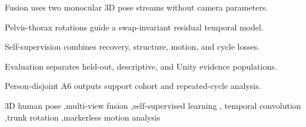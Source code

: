 \documentclass[a4paper,fleqn]{cas-sc}
\begin{document}
\begin{highlights}
\item Fusion uses two monocular 3D pose streams without camera parameters.
\item Pelvis-thorax rotations guide a swap-invariant residual temporal model.
\item Self-supervision combines recovery, structure, motion, and cycle losses.
\item Evaluation separates held-out, descriptive, and Unity evidence populations.
\item Person-disjoint A6 outputs support cohort and repeated-cycle analysis.
\end{highlights}

\begin{keywords}
3D human pose \sep multi-view fusion \sep self-supervised learning \sep
temporal convolution \sep trunk rotation \sep markerless motion analysis
\end{keywords}

\maketitle













\printcredits



\end{document}
